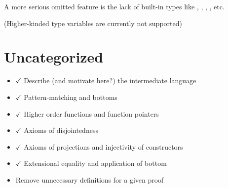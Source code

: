A more serious omitted feature is the lack of built-in types like ,
, , , etc.

(Higher-kinded type variables are currently not supported)

\section{Uncategorized}

\begin{itemize}

\item $\checkmark$ Describe (and motivate here?) the intermediate language

\item $\checkmark$ Pattern-matching and bottoms

\item $\checkmark$ Higher order functions and function pointers

\item $\checkmark$ Axioms of disjointedness

\item $\checkmark$ Axioms of projections and injectivity of constructors

\item $\checkmark$ Extensional equality and application of bottom

\item Remove unnecessary definitions for a given proof

\end{itemize}